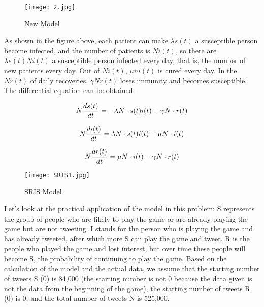 \documentclass[12pt]{article}  %
\begin{document}
\begin{figure}[htbp]
	\centering
	\texttt{[image: 2.jpg]}
	\caption{New Model}\label{fig:result}
\end{figure}

As shown in the figure above, each patient can make $\lambda s(t)$ a susceptible person become infected, and the number of patients is $ N i(t)$, so there are $\lambda s(t) N i(t)$ a susceptible person infected every day, that is, the number of new patients every day.
Out of $ N i(t)$, $\mu n  i(t)$ is cured every day.
In the $Nr(t)$ of daily recoveries, $ \gamma N r(t)$ loses immunity and becomes susceptible.
The differential equation can be obtained:

\begin{equation}
\large N\frac{ds(t)}{dt} =-\lambda N\cdot s(t)i(t)+\gamma N\cdot r(t)
\end{equation}

\begin{equation}
\large N\frac{di(t)}{dt} =\lambda N\cdot s(t)i(t)-\mu N\cdot i(t)
\end{equation}

\begin{equation}
\large N\frac{dr(t)}{dt} =\mu N\cdot i(t)-\gamma N\cdot r(t)
\end{equation}

\begin{figure}[htbp]
	\centering
	\texttt{[image: SRIS1.jpg]}
	\caption{SRIS Model}\label{fig:result}
\end{figure}



Let's look at the practical application of the model in this problem:
S represents the group of people who are likely to play the game or are already playing the game but are not tweeting.
I stands for the person who is playing the game and has already tweeted, after which more S can play the game and tweet.
R is the people who played the game and lost interest, but over time these people will become S, the probability of continuing to play the game.
Based on the calculation of the model and the actual data, we assume that the starting number of tweets S (0) is 84,000 (the starting number is not 0 because the data given is not the data from the beginning of the game), the starting number of tweets R (0) is 0, and the total number of tweets N is 525,000.
\end{document}
